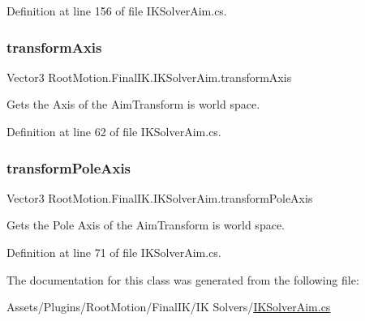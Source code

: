 Definition at line 156 of file I\+K\+Solver\+Aim.\+cs.

\mbox{\label{class_root_motion_1_1_final_i_k_1_1_i_k_solver_aim_ada13db8445b9222b2bc50d7427c8fe2d}} 
\subsubsection{\texorpdfstring{transform\+Axis}{transformAxis}}
{\footnotesize\ttfamily Vector3 Root\+Motion.\+Final\+I\+K.\+I\+K\+Solver\+Aim.\+transform\+Axis\hspace{0.3cm}{\ttfamily [get]}}



Gets the Axis of the Aim\+Transform is world space. 



Definition at line 62 of file I\+K\+Solver\+Aim.\+cs.

\mbox{\label{class_root_motion_1_1_final_i_k_1_1_i_k_solver_aim_a2131a40de8820e5f02dddfa4dc6305f2}} 
\subsubsection{\texorpdfstring{transform\+Pole\+Axis}{transformPoleAxis}}
{\footnotesize\ttfamily Vector3 Root\+Motion.\+Final\+I\+K.\+I\+K\+Solver\+Aim.\+transform\+Pole\+Axis\hspace{0.3cm}{\ttfamily [get]}}



Gets the Pole Axis of the Aim\+Transform is world space. 



Definition at line 71 of file I\+K\+Solver\+Aim.\+cs.



The documentation for this class was generated from the following file\+:\begin{DoxyCompactItemize}
\item 
Assets/\+Plugins/\+Root\+Motion/\+Final\+I\+K/\+I\+K Solvers/\mbox{\hyperlink{_i_k_solver_aim_8cs}{I\+K\+Solver\+Aim.\+cs}}\end{DoxyCompactItemize}
